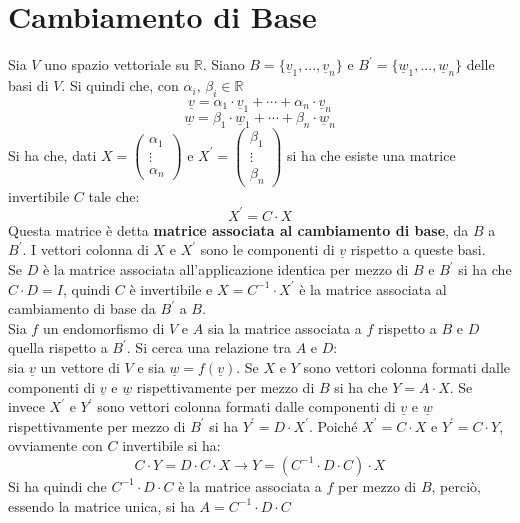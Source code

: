 \documentclass[a4paper,12pt, oneside]{book}
\begin{document}
\section{Cambiamento di Base}
Sia $V$ uno spazio vettoriale su $\mathbb{R}$. Siano $B=\{\underline{v}_1,...,\underline{v}_n\}$ e $B^{'}=\{\underline{w}_1,...,\underline{w}_n\}$ delle basi di $V$. Si quindi che, con $\alpha_i,\,\beta_i\in\mathbb{R}$
$$\underline{v}=\alpha_1\cdot \underline{v}_1+\cdots+\alpha_n\cdot \underline{v}_n$$
$$\underline{w}=\beta_1\cdot \underline{w}_1+\cdots+\beta_n\cdot \underline{w}_n$$
Si ha che, dati $
	X=\left(\begin{matrix}
			\alpha_1 \\
			\vdots   \\
			\alpha_n
		\end{matrix}\right)
$ e $X^{'}=\left(\begin{matrix}
			\beta_1 \\
			\vdots  \\
			\beta_n
		\end{matrix}\right)
$ si ha che esiste una matrice invertibile $C$ tale che:
$$X^{'}=C\cdot X$$
Questa matrice è detta \textbf{matrice associata al cambiamento di base}, da $B$ a $B^{'}$. I vettori colonna di $X$ e $X^{'}$ sono le componenti di $\underline{v}$ rispetto a queste basi.\\
Se $D$ è la matrice associata all'applicazione identica per mezzo di $B$ e $B^{'}$ si ha che $C\cdot D=I$, quindi $C$ è invertibile e $X=C^{-1}\cdot X^{'}$ è la matrice associata al cambiamento di base da $B^{'}$ a $B$.\\
Sia $f$ un endomorfismo di $V$ e $A$ sia la matrice associata a $f$ rispetto a $B$ e $D$ quella rispetto a $B^{'}$. Si cerca una relazione tra $A$ e $D$:\\
sia $\underline{v}$ un vettore di $V$ e sia $\underline{w}=f(\underline{v})$. Se $X$ e $Y$ sono vettori colonna formati dalle componenti di $\underline{v}$ e $\underline{w}$ rispettivamente per mezzo di $B$ si ha che $Y=A\cdot X$.
\newpage
Se invece $X^{'}$ e $Y^{'}$ sono vettori colonna formati dalle componenti di $\underline{v}$ e $\underline{w}$ rispettivamente per mezzo di $B^{'}$ si ha $Y^{'}=D\cdot X^{'}$. Poiché $X^{'}=C\cdot X$ e $Y^{'}=C\cdot Y$, ovviamente con $C$ invertibile si ha:
$$C\cdot Y=D\cdot C\cdot X\longrightarrow Y=(C^{-1}\cdot D\cdot C)\cdot X$$
Si ha quindi che $C^{-1}\cdot D\cdot C$ è la matrice associata a $f$ per mezzo di $B$, perciò, essendo la matrice unica, si ha $A=C^{-1}\cdot D\cdot C$
\end{document}
